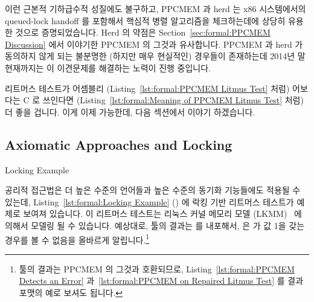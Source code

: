 이런 근본적 기하급수적 성질에도 불구하고, PPCMEM 과 herd 는 x86 시스템에서의
queued-lock handoff 를 포함해서 핵심적 병렬 알고리즘을 체크하는데에 상당히
유용한 것으로 증명되었습니다.
Herd 의 약점은
Section~\ref{sec:formal:PPCMEM Discussion} 에서 이야기한 PPCMEM 의 그것과
유사합니다.
PPCMEM 과 herd 가 동의하지 않게 되는 불분명한 (하지만 매우 현실적인) 경우들이
존재하는데 2014년 말 현재까지는 이 이견문제를 해결하는 노력이 진행 중입니다.
\iffalse

Despite their exponential nature, both PPCMEM and herd have proven quite
useful for checking key parallel algorithms, including the queued-lock
handoff on x86 systems.
The weaknesses of the herd tool are similar to those of PPCMEM, which
were described in
Section~\ref{sec:formal:PPCMEM Discussion}.
There are some obscure (but very real) cases for which the PPCMEM and
herd tools disagree, and as of late 2014 resolving these disagreements
was ongoing.
\fi

리트머스 테스트가 어셈블리
(Listing~\ref{lst:formal:PPCMEM Litmus Test} 처럼) 어보다는 C 로 쓰인다면
(Listing~\ref{lst:formal:Meaning of PPCMEM Litmus Test} 처럼) 더 좋을 겁니다.
이게 이제 가능한데, 다음 섹션에서 이야기 하겠습니다.
\iffalse

It would be helpful if the litmus tests could be written in C
(as in Listing~\ref{lst:formal:Meaning of PPCMEM Litmus Test})
rather than assembly
(as in Listing~\ref{lst:formal:PPCMEM Litmus Test}).
This is now possible, as will be described in the following sections.
\fi

\subsection{Axiomatic Approaches and Locking}
\label{sec:formal:Axiomatic Approaches and Locking}

\begin{listing}[tb]

\caption{Locking Example}
\label{lst:formal:Locking Example}
\end{listing}

공리적 접근법은 더 높은 수준의 언어들과 높은 수준의 동기화 기능들에도 적용될 수
있는데, Listing~\ref{lst:formal:Locking Example} () 에
락킹 기반 리트머스 테스트가 예제로 보여져 있습니다.
이 리트머스 테스트는 리눅스 커널 메모리 모델
(LKMM)~\cite{Alglave:2018:FSC:3173162.3177156,LucMaranget2018lock.cat} 에
의해서 모델링 될 수 있습니다.
예상대로,  툴의 결과는  를 내포해서,  은  가
값 1을 갖는 경우를 볼 수 없음을 올바르게 알립니다.\footnote{
	 툴의 결과는 PPCMEM 의 그것과 호환되므로,
	Listing~\ref{lst:formal:PPCMEM Detects an Error}
	과~\ref{lst:formal:PPCMEM on Repaired Litmus Test} 를 결과 포맷의 예로
	보셔도 됩니다.}
\iffalse

